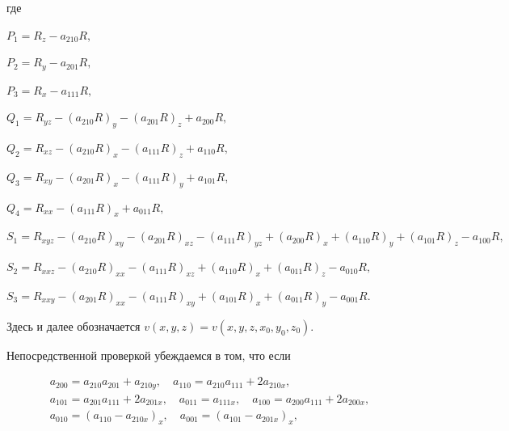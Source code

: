 где


$P_{1}=R_{z}-a_{210}R,$ 


$P_{2}=R_{y}-a_{201}R,$


$P_{3}=R_{x}-a_{111}R,$


$Q_{1}=R_{yz}-(a_{210}R)_{y}-(a_{201}R)_{z}+a_{200}R,$


$Q_{2}=R_{xz}-(a_{210}R)_{x}-(a_{111}R)_{z}+a_{110}R,$


${Q_{3}=R_{xy}-(a_{201}R)_{x}}-(a_{111}R)_{y}+a_{101}R,$


$Q_{4}=R_{xx}-(a_{111}R)_{x}+a_{011}R,$


$S_{1}=R_{xyz}-(a_{210}R)_{xy}-(a_{201}R)_{xz}-(a_{111}R)_{yz}+


(a_{200}R)_{x}+(a_{110}R)_{y}+(a_{101}R)_{z}-a_{100}R,


$


$


S_{2}=R_{xxz}-(a_{210}R)_{xx}-(a_{111}R)_{xz}+(a_{110}R)_{x}+


(a_{011}R)_{z}-a_{010}R,


$


$


S_{3}=R_{xxy}-(a_{201}R)_{xx}-(a_{111}R)_{xy}+(a_{101}R)_{x}+


(a_{011}R)_{y}-a_{001}R.


$


Здесь и далее обозначается $v(x, y, z)=v(x, y, z,x_0,y_0,z_0)$.





Непосредственной проверкой убеждаемся в том, что если


\begin{equation}\label{mironov28}


\begin{array}{c}


a_{200}=a_{210}a_{201}+a_{210y},\quad


a_{110}=a_{210}a_{111}+2a_{210x},\\


a_{101}=a_{201}a_{111}+2a_{201x},\quad


a_{011}=a_{111x},\quad 


a_{100}=a_{200}a_{111}+2a_{200x},\\


a_{010}=(a_{110}-a_{210x})_{x},\quad a_{001}=(a_{101}-a_{201x})_{x},


\end{array}


\end{equation}


